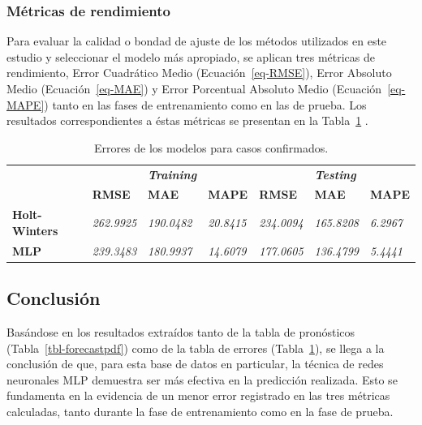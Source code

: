 \documentclass[
  us-letterpaper,
]{scrreprt}
\theoremstyle{plain}
\theoremstyle{definition}
\theoremstyle{plain}
\theoremstyle{definition}
\theoremstyle{remark}
\begin{document}
\subsubsection{Métricas de
rendimiento}\label{muxe9tricas-de-rendimiento}

Para evaluar la calidad o bondad de ajuste de los métodos utilizados en
este estudio y seleccionar el modelo más apropiado, se aplican tres
métricas de rendimiento, Error Cuadrático Medio
(Ecuación~\ref{eq-RMSE}), Error Absoluto Medio (Ecuación~\ref{eq-MAE}) y
Error Porcentual Absoluto Medio (Ecuación~\ref{eq-MAPE}) tanto en las
fases de entrenamiento como en las de prueba. Los resultados
correspondientes a éstas métricas se presentan en la Tabla~\ref{tbl-err}
.

\begin{longtable}[]{@{}
  >{\raggedright\arraybackslash}p{}
  >{\centering\arraybackslash}p{}
  >{\centering\arraybackslash}p{}
  >{\centering\arraybackslash}p{}
  >{\centering\arraybackslash}p{}
  >{\centering\arraybackslash}p{}
  >{\centering\arraybackslash}p{}@{}}
\caption{Errores de los modelos para casos
confirmados.}\label{tbl-err}\tabularnewline
\toprule\noalign{}
\endfirsthead
\endhead
\bottomrule\noalign{}
\endlastfoot
& & \textbf{\emph{Training}} & & & \textbf{\emph{Testing}} & \\
& \textbf{RMSE} & \textbf{MAE} & \textbf{MAPE} & \textbf{RMSE} &
\textbf{MAE} & \textbf{MAPE} \\
\textbf{Holt-Winters} & \emph{262.9925} & \emph{190.0482} &
\emph{20.8415} & \emph{234.0094} & \emph{165.8208} & \emph{6.2967} \\
\textbf{MLP} & \emph{239.3483} & \emph{180.9937} & \emph{14.6079} &
\emph{177.0605} & \emph{136.4799} & \emph{5.4441} \\
\end{longtable}

\subsection{Conclusión}\label{conclusiuxf3n}

Basándose en los resultados extraídos tanto de la tabla de pronósticos
(Tabla~\ref{tbl-forecastpdf}) como de la tabla de errores
(Tabla~\ref{tbl-err}), se llega a la conclusión de que, para esta base
de datos en particular, la técnica de redes neuronales MLP demuestra ser
más efectiva en la predicción realizada. Esto se fundamenta en la
evidencia de un menor error registrado en las tres métricas calculadas,
tanto durante la fase de entrenamiento como en la fase de prueba.
\end{document}
